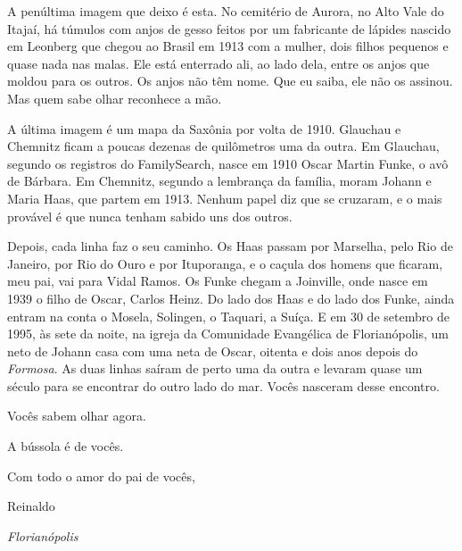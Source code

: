 \documentclass[
  brazilian,
  11pt,
  openany]{book}
\begin{document}
A penúltima imagem que deixo é esta. No cemitério de Aurora, no Alto
Vale do Itajaí, há túmulos com anjos de gesso feitos por um fabricante
de lápides nascido em Leonberg que chegou ao Brasil em 1913 com a
mulher, dois filhos pequenos e quase nada nas malas. Ele está enterrado
ali, ao lado dela, entre os anjos que moldou para os outros. Os anjos
não têm nome. Que eu saiba, ele não os assinou. Mas quem sabe olhar
reconhece a mão.

A última imagem é um mapa da Saxônia por volta de 1910. Glauchau e
Chemnitz ficam a poucas dezenas de quilômetros uma da outra. Em
Glauchau, segundo os registros do FamilySearch, nasce em 1910 Oscar
Martin Funke, o avô de Bárbara. Em Chemnitz, segundo a lembrança da
família, moram Johann e Maria Haas, que partem em 1913. Nenhum papel diz
que se cruzaram, e o mais provável é que nunca tenham sabido uns dos
outros.

Depois, cada linha faz o seu caminho. Os Haas passam por Marselha, pelo
Rio de Janeiro, por Rio do Ouro e por Ituporanga, e o caçula dos homens
que ficaram, meu pai, vai para Vidal Ramos. Os Funke chegam a Joinville,
onde nasce em 1939 o filho de Oscar, Carlos Heinz. Do lado dos Haas e do
lado dos Funke, ainda entram na conta o Mosela, Solingen, o Taquari, a
Suíça. E em 30 de setembro de 1995, às sete da noite, na igreja da
Comunidade Evangélica de Florianópolis, um neto de Johann casa com uma
neta de Oscar, oitenta e dois anos depois do \emph{Formosa}. As duas
linhas saíram de perto uma da outra e levaram quase um século para se
encontrar do outro lado do mar. Vocês nasceram desse encontro.

Vocês sabem olhar agora.

A bússola é de vocês.

Com todo o amor do pai de vocês,

Reinaldo

\emph{Florianópolis}
\end{document}
